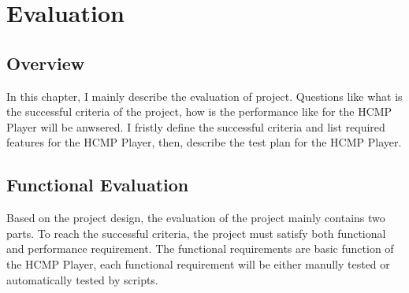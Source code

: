 
\chapter{Evaluation} %



\ifpdf
    \graphicspath{{X/figures/PNG/}{X/figures/PDF/}{X/figures/}}
\else
    \graphicspath{{X/figures/EPS/}{X/figures/}}
\fi


\section{Overview}
In this chapter, I mainly describe the evaluation of project. Questions 
like what is the successful criteria of the project, how is the performance 
like for the HCMP Player will be anwsered. I fristly define the successful 
criteria and list required features for the HCMP Player, then, describe  
the test plan for the HCMP Player.

\section{Functional Evaluation}
Based on the project design, the evaluation of the project mainly contains 
two parts. To reach the successful criteria, the project must satisfy 
both functional and performance requirement. The functional requirements  
are basic function of the HCMP Player, each functional requirement will be 
either manully tested or automatically tested by scripts. 

